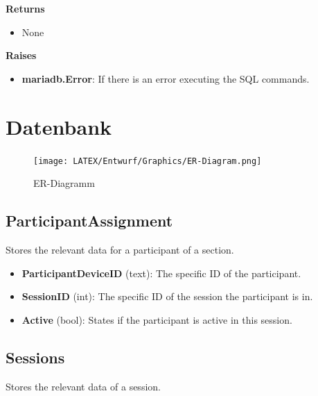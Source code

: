 \documentclass[oneside, ngerman]{sdqtechreport}
\begin{document}
\textbf{Returns}

\begin{itemize} \item None \end{itemize}

\textbf{Raises}

\begin{itemize} \item \textbf{mariadb.Error}: If there is an error executing the SQL commands. \end{itemize}





\chapter{Datenbank}
\label{chap:Datenbank}

\begin{figure}[h]
    \texttt{[image: LATEX/Entwurf/Graphics/ER-Diagram.png]}
    \caption{ER-Diagramm}
    \label{fig:ER-Diagramm}
\end{figure}

\section{ParticipantAssignment}

Stores the relevant data for a participant of a section.

\begin{itemize}
    \item \textbf{ParticipantDeviceID} (text): The specific ID of the participant.
    \item \textbf{SessionID} (int): The specific ID of the session the participant is in.
    \item \textbf{Active} (bool): States if the participant is active in this session.
\end{itemize}

\section{Sessions}

Stores the relevant data of a session.
\end{document}
